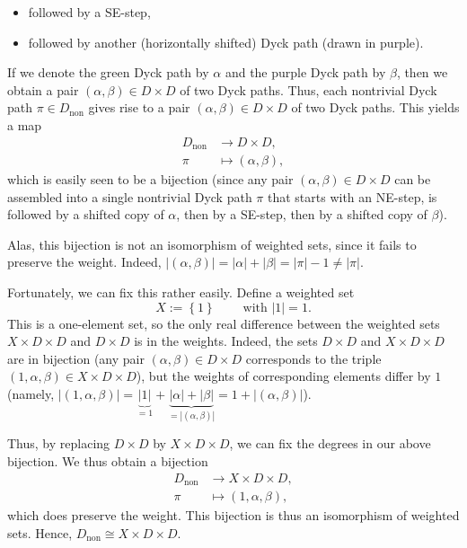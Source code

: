 \begin{itemize}
\begin{itemize}
\item followed by a SE-step,

\item followed by another (horizontally shifted) Dyck path (drawn in purple).
\end{itemize}

If we denote the green Dyck path by $\alpha$ and the purple Dyck path by
$\beta$, then we obtain a pair $\left(  \alpha,\beta\right)  \in D\times D$ of
two Dyck paths. Thus, each nontrivial Dyck path $\pi\in D_{\operatorname*{non}%
}$ gives rise to a pair $\left(  \alpha,\beta\right)  \in D\times D$ of two
Dyck paths. This yields a map%
\begin{align*}
D_{\operatorname*{non}} &  \rightarrow D\times D,\\
\pi &  \mapsto\left(  \alpha,\beta\right)  ,
\end{align*}
which is easily seen to be a bijection (since any pair $\left(  \alpha
,\beta\right)  \in D\times D$ can be assembled into a single nontrivial Dyck
path $\pi$ that starts with an NE-step, is followed by a shifted copy of
$\alpha$, then by a SE-step, then by a shifted copy of $\beta$).

Alas, this bijection is not an isomorphism of weighted sets, since it fails to
preserve the weight. Indeed, $\left\vert \left(  \alpha,\beta\right)
\right\vert =\left\vert \alpha\right\vert +\left\vert \beta\right\vert
=\left\vert \pi\right\vert -1\neq\left\vert \pi\right\vert $.

Fortunately, we can fix this rather easily. Define a weighted set%
\[
X:=\left\{  1\right\}  \ \ \ \ \ \ \ \ \ \ \text{with }\left\vert 1\right\vert
=1.
\]
This is a one-element set, so the only real difference between the weighted
sets $X\times D\times D$ and $D\times D$ is in the weights. Indeed, the sets
$D\times D$ and $X\times D\times D$ are in bijection (any pair $\left(
\alpha,\beta\right)  \in D\times D$ corresponds to the triple $\left(
1,\alpha,\beta\right)  \in X\times D\times D$), but the weights of
corresponding elements differ by $1$ (namely, $\left\vert \left(
1,\alpha,\beta\right)  \right\vert =\underbrace{\left\vert 1\right\vert }%
_{=1}+\underbrace{\left\vert \alpha\right\vert +\left\vert \beta\right\vert
}_{=\left\vert \left(  \alpha,\beta\right)  \right\vert }=1+\left\vert \left(
\alpha,\beta\right)  \right\vert $).

Thus, by replacing $D\times D$ by $X\times D\times D$, we can fix the degrees
in our above bijection. We thus obtain a bijection%
\begin{align*}
D_{\operatorname*{non}} &  \rightarrow X\times D\times D,\\
\pi &  \mapsto\left(  1,\alpha,\beta\right)  ,
\end{align*}
which does preserve the weight. This bijection is thus an isomorphism of
weighted sets. Hence, $D_{\operatorname*{non}}\cong X\times D\times D$.


\end{itemize}
